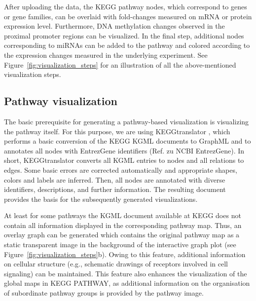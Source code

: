 \documentclass{bioinfo}
\begin{document}
After uploading the data, the KEGG pathway nodes, which correspond to genes or gene families, can be
overlaid with fold-changes measured on mRNA or protein expression level. Furthermore, DNA
methylation changes observed in the proximal promoter regions can be visualized. In the final step,
additional nodes corresponding to miRNAs can be added to the pathway and colored according to the
expression changes measured in the underlying experiment. See Figure~\ref{fig:visualization_steps}
for an illustration of all the above-mentioned visualization steps.

\subsection{Pathway visualization}

The basic prerequisite for generating a pathway-based visualization is visualizing the pathway
itself. For this purpose, we are using KEGGtranslator \citep[see][]{Wrzodek2011}, which performs a
basic conversion of the KEGG KGML documents to GraphML and to annotates all nodes with EntrezGene
identifiers (Ref. zu NCBI EntrezGene). In short, KEGGtranslator converts all KGML entries to nodes
and all relations to edges. Some basic errors are corrected automatically and appropriate shapes,
colors and labels are inferred. Then, all nodes are annotated with diverse identifiers,
descriptions, and further information. The resulting document provides the basis for the
subsequently generated visualizations.

% 

At least for some pathways the KGML document available at KEGG does not contain all information 
displayed in the corresponding pathway map. Thus, an overlay graph can be generated which contains the 
original pathway map as a static transparent image in the background of the interactive graph plot 
(see Figure~\ref{fig:visualization_steps}b). Owing to this feature, additional information on 
cellular structure (e.g., schematic drawings of receptors involved in cell signaling) can be maintained. 
This feature also enhances the visualization of the global maps in KEGG PATHWAY, as additional
information on the organisation of subordinate pathway groups is provided by the pathway image.
\end{document}
